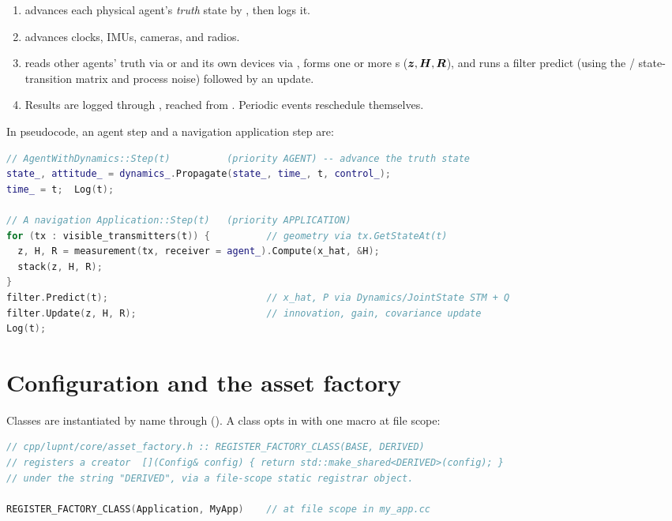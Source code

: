 \begin{enumerate}[leftmargin=*]
  \item {} advances each physical agent's \emph{truth}
        state by , then logs it.
  \item {} advances clocks, IMUs, cameras, and radios.
  \item {} reads other agents' truth via 
        or  and its own devices via
        , forms one or more s
        ($\bm{z}, \bm{H}, \bm{R}$), and runs a filter predict (using the
         /  state-transition matrix and process
        noise) followed by an update.
  \item Results are logged through , reached from
        . Periodic events reschedule themselves.
\end{enumerate}

In pseudocode, an agent step and a navigation application step are:

\begin{lstlisting}[language=cpp, caption={Truth propagation and one navigation cycle (pseudocode).}, label={lst:sim-step-pseudocode}]
// AgentWithDynamics::Step(t)          (priority AGENT) -- advance the truth state
state_, attitude_ = dynamics_.Propagate(state_, time_, t, control_);
time_ = t;  Log(t);

// A navigation Application::Step(t)   (priority APPLICATION)
for (tx : visible_transmitters(t)) {          // geometry via tx.GetStateAt(t)
  z, H, R = measurement(tx, receiver = agent_).Compute(x_hat, &H);
  stack(z, H, R);
}
filter.Predict(t);                            // x_hat, P via Dynamics/JointState STM + Q
filter.Update(z, H, R);                       // innovation, gain, covariance update
Log(t);
\end{lstlisting}

\section{Configuration and the asset factory}
\label{sec:sim-factory}

Classes are instantiated by name through 
(). A class opts in with one macro at file
scope:

\begin{lstlisting}[language=cpp, caption={Factory registration.}, label={lst:sim-register}]
// cpp/lupnt/core/asset_factory.h :: REGISTER_FACTORY_CLASS(BASE, DERIVED)
// registers a creator  [](Config& config) { return std::make_shared<DERIVED>(config); }
// under the string "DERIVED", via a file-scope static registrar object.

REGISTER_FACTORY_CLASS(Application, MyApp)    // at file scope in my_app.cc
\end{lstlisting}

